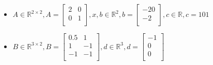\documentclass[12pt]{article}
\begin{document}
\begin{itemize}
  \item $A \in \mathbb{R}^{2 \times 2}, A = \begin{bmatrix}
               2 & 0 \\
               0 & 1 \\
  \end{bmatrix}, x,b \in \mathbb{R}^{2}, b = \begin{bmatrix}   -20 \\ -2\\ \end{bmatrix}, c \in \mathbb{R}, c= 101$ 
  \item $B \in \mathbb{R}^{3 \times 2}, B = \begin{bmatrix}
               0.5 & 1 \\
               1 & -1 \\
               -1 & -1 \\
  \end{bmatrix}, d \in \mathbb{R}^{3}, d = \begin{bmatrix}   -1 \\ 0\\ 0\\\end{bmatrix}$
\end{itemize}
\end{document}
